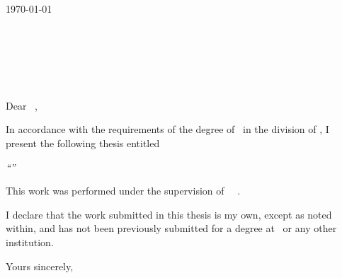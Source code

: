\thispagestyle{plain}
\begin{flushright}
  \authorFirst\ \authorLast\\
  \medskip
  \authorContact
\end{flushright}

\vspace{3cm}
\today\vspace{1cm}\\
\headHonShort\ \headFirst\ \headLast\\
\headPos\\
\department\\
\institution\\
\location\\
\vspace{1cm}\\
Dear \headHonLong\ \headLast ,\medskip

In accordance with the requirements of the degree of \degree\ in the division of \major , I present the following thesis entitled \begin{center} \textit{``\documentTitle ''} \end{center}  

This work was performed under the supervision of \superHon\ \superFirst\ \superLast .

I declare that the work submitted in this thesis is my own, except as noted within, and has not been previously submitted for a degree at \institution\ or any other institution.

\bigskip
\begin{flushright}
	Yours sincerely,\\
	\authorFirst\ \authorLast
\end{flushright}